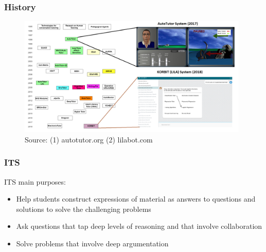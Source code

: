 \documentclass{beamer}
\begin{document}
\begin{frame}
\frametitle{History}

		
		\begin{figure}
		
			\includegraphics[width=110mm]{history.png}\\
		
			
		
			{\tiny Source: (1) autotutor.org
				(2) lilabot.com}
			
			
		\end{figure}
		

\end{frame}
\begin{frame}
\frametitle{ITS }
	\begin{block}{ITS main purposes: }
	\begin{itemize}
		\item Help students construct expressions of material as answers to questions and solutions to solve the challenging problems
		\item Ask questions that tap deep levels of reasoning and that involve collaboration
		\item Solve problems that involve deep argumentation
	\end{itemize} 
\end{block}
\end{frame}
\end{document}
